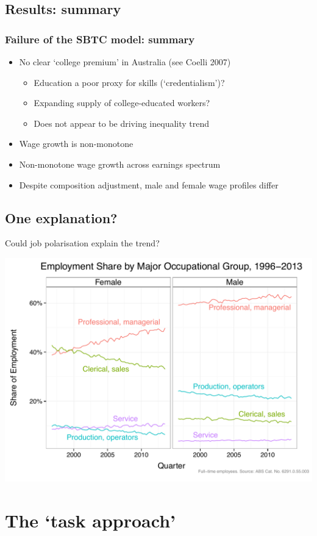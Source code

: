 \documentclass[red]{beamer}
\newcommand{\vitem}{\vfill\item}
\begin{document}
\subsection{Results: summary}
\begin{frame}
  \frametitle{Failure of the SBTC model: summary}
  \begin{itemize}
  \vitem No clear `college premium' in Australia (see Coelli 2007)
  \begin{itemize}
  \vitem Education a poor proxy for skills (`credentialism')?
  \vitem Expanding supply of college-educated workers?
  \vitem Does not appear to be driving inequality trend
  \end{itemize}
  \vitem Wage growth is non-monotone
  \vitem Non-monotone wage growth across earnings spectrum
  \vitem Despite composition adjustment, male and female wage profiles differ
  \end{itemize}
\end{frame}

\subsection{One explanation?}
\begin{frame}{Could job polarisation explain the trend?}
  \begin{center}
    \includegraphics[width=\textwidth]{slides_fig/occ_share_sex.pdf}
  \end{center}
\end{frame}

\section{The `task approach'}
\end{document}
